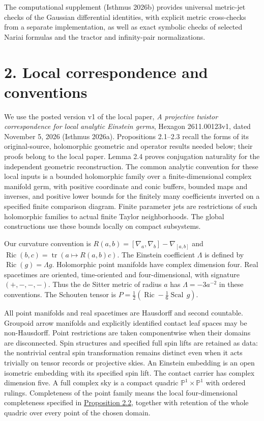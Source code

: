 \documentclass[
  english,
  11pt,
  reqno]{amsart}
\begin{document}
The computational supplement (Isthmus 2026b) provides universal
metric-jet checks of the Gaussian differential identities, with explicit
metric cross-checks from a separate implementation, as well as exact
symbolic checks of selected Nariai formulas and the tractor and
infinity-pair normalizations.

\protect{}\label{sec:local-input-v08}

\section{2. Local correspondence and
conventions}\label{local-correspondence-and-conventions}

We use the posted version v1 of the local paper, \emph{A projective
twistor correspondence for local analytic Einstein germs}, Hexagon
2611.00123v1, dated November 5, 2026 (Isthmus 2026a). Propositions
2.1--2.3 recall the forms of its original-source, holomorphic geometric
and operator results needed below; their proofs belong to the local
paper. Lemma 2.4 proves conjugation naturality for the independent
geometric reconstruction. The common analytic convention for these local
inputs is a bounded holomorphic family over a finite-dimensional complex
manifold germ, with positive coordinate and conic buffers, bounded maps
and inverses, and positive lower bounds for the finitely many
coefficients inverted on a specified finite comparison diagram. Finite
parameter jets are restrictions of such holomorphic families to actual
finite Taylor neighborhoods. The global constructions use these bounds
locally on compact subsystems.

Our curvature convention is
\(R(a,b)=[\nabla_a,\nabla_b]-\nabla_{[a,b]}\) and
\(\operatorname{Ric}(b,c)=\operatorname{tr}(a\mapsto R(a,b)c)\). The
Einstein coefficient \(\Lambda\) is defined by
\(\operatorname{Ric}(g)=\Lambda g\). Holomorphic point manifolds have
complex dimension four. Real spacetimes are oriented, time-oriented and
four-dimensional, with signature \((+,-,-,-)\). Thus the de Sitter
metric of radius \(a\) has \(\Lambda=-3a^{-2}\) in these conventions.
The Schouten tensor is
\(P=\frac12(\operatorname{Ric}-\frac16\operatorname{Scal}\,g)\).

All point manifolds and real spacetimes are Hausdorff and second
countable. Groupoid arrow manifolds and explicitly identified contact
leaf spaces may be non-Hausdorff. Point restrictions are taken
componentwise when their domains are disconnected. Spin structures and
specified full spin lifts are retained as data: the nontrivial central
spin transformation remains distinct even when it acts trivially on
tensor records or projective skies. An Einstein embedding is an open
isometric embedding with its specified spin lift. The contact carrier
has complex dimension five. A full complex sky is a compact quadric
\(\mathbb P^1\times\mathbb P^1\) with ordered rulings. Completeness of
the point family means the local four-dimensional completeness specified
in \hyperref[prop:independent-local-ray-recognition-v09]{Proposition
2.2}, together with retention of the whole quadric over every point of
the chosen domain.
\end{document}
